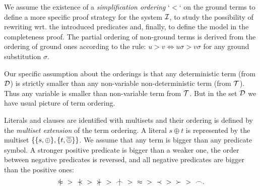 We assume the existence of a {\em simplification ordering} `$<$` on 
the ground terms \cite{Der}
to define a more specific proof
strategy for the system $\mbox {$\cal I$}$, to study the possibility of rewriting
wrt. the introduced predicates and, finally, to define the model in the
completeness proof. 
%
The partial ordering of
non-ground terms is derived from the ordering of ground ones
according to the rule: $u > v \Leftrightarrow u\sigma > v\sigma$
for any ground substitution $\sigma$.

Our specific assumption about the orderings is that any
deterministic term (from ${\cal D}$) is strictly smaller than any non-variable
non-deterministic term (from \({\cal T}\)). Thus
any variable is smaller than non-variable term from
${\cal T}$.  But in the set ${\cal D}$ we have usual picture of term ordering.

Literals and clauses are identified with multisets and their ordering is defined by the
{\em multiset extension} \cite{DM} of the term ordering.  
%
A literal $s\oplus t$ is represented by the multiset \(\{\{s,\oplus\},
\{t,\overline{\oplus}\}\}\).  We assume that any term is bigger than any predicate
symbol.  A stronger positive predicate is bigger than a weaker one, the order
between negative predicates is reversed, and all negative predicates are
bigger than the positive ones:
\begin{equation} \label{eq:predicate-order}
\notEq\ >\ \notIncl\ >\ \notCont\ >\ \notInt\ >\ \Eq\ >\ \Incl\ >\ \Cont\ >\
\Int.
\end{equation}

